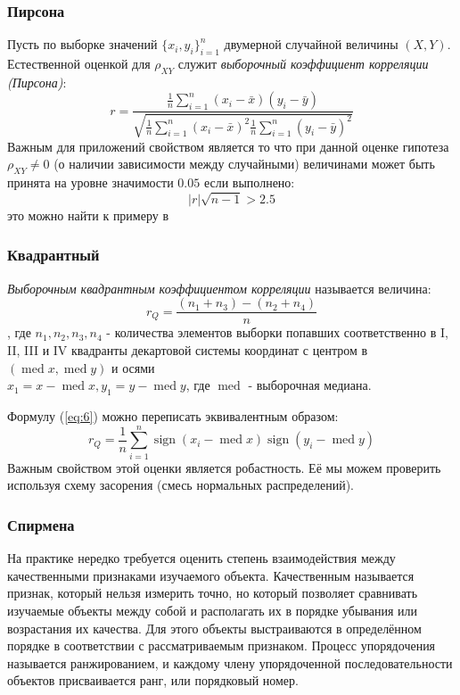\documentclass[12pt,a4paper]{article}
\DeclareMathOperator{\med}{med}
\DeclareMathOperator{\sign}{sign}
\begin{document}
\subsubsection{Пирсона}
Пусть по выборке значений $\{x_i, y_i\}_{i=1}^n$ двумерной случайной величины $(X,Y)$. Естественной оценкой для $\rho_{XY}$ служит \textit{выборочный коэффициент корреляции (Пирсона)}:
\begin{equation}
	r = \frac{\frac{1}{n} \sum_{i=1}^{n}{(x_i - \bar{x})(y_i - \bar{y})}}
	{\sqrt{
			\frac{1}{n} \sum_{i=1}^{n}{(x_i-\bar{x})^2}
			\frac{1}{n} \sum_{i=1}^{n}{(y_i-\bar{y})^2}}}
\end{equation}
Важным для приложений свойством является то что при данной оценке гипотеза $\rho_{XY} \neq 0$ (о наличии зависимости между случайными) величинами может быть принята на уровне значимости $0.05$ если выполнено: 
\begin{equation}\label{eq:5}
	|r|\sqrt{n-1} > 2.5
\end{equation}
это можно найти к примеру в \cite[стр. 538]{verrazdely}

\subsubsection{Квадрантный}
\textit{Выборочным квадрантным коэффициентом корреляции} называется величина:
\begin{equation}\label{eq:6}
	r_Q = \frac{(n_1 + n_3) - (n_2 + n_4)}{n}
\end{equation}
, где $n_1, n_2, n_3, n_4$ - количества элементов выборки попавших соответственно в I, II, III и IV квадранты декартовой системы координат с центром в $(\med{x}, \med{y})$ и осями \\
$x_1 = x - \med{x}, y_1 = y - \med{y}$, где $\med$ - выборочная медиана.

Формулу (\ref{eq:6}) можно переписать эквивалентным образом:
\begin{equation}
	r_Q = \frac{1}{n}\sum_{i=1}^{n}{\sign(x_i -\med{x})\sign(y_i -\med{y})}
\end{equation}
Важным свойством этой оценки является робастность. Её мы можем проверить используя схему засорения (смесь нормальных распределений).

\subsubsection{Спирмена}
На практике нередко требуется оценить степень взаимодействия между качественными признаками изучаемого объекта. Качественным называется признак, который нельзя измерить точно, но который позволяет сравнивать изучаемые объекты между собой и располагать их в порядке убывания или
возрастания их качества. Для этого объекты выстраиваются в определённом порядке в соответствии с рассматриваемым признаком. Процесс упорядочения называется ранжированием, и каждому члену упорядоченной последовательности объектов присваивается ранг, или порядковый номер. \\
\end{document}
